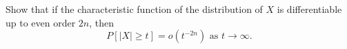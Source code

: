 Show that if the characteristic function of the distribution of $X$ is differentiable up to even order $2n$, then
$$P[|X| \geq t] = o(t^{-2n}) \text{ as } t \to \infty.$$

